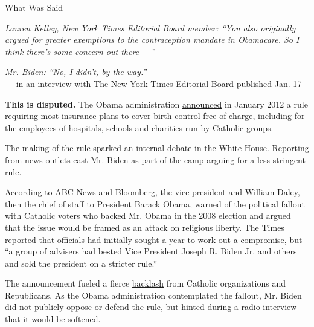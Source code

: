 What Was Said

\emph{Lauren Kelley, New York Times Editorial Board member: ``You also
originally argued for greater exemptions to the contraception mandate in
Obamacare. So I think there's some concern out there ---''}

\emph{Mr. Biden: ``No, I didn't, by the way.''}\\
--- in an
\href{https://www.nytimes3xbfgragh.onion/interactive/2020/01/17/opinion/joe-biden-nytimes-interview.html?action=click\&module=Opinion\&pgtype=Homepage}{interview}
with The New York Times Editorial Board published Jan. 17

\textbf{This is disputed.} The Obama administration
\href{https://www.nytimes3xbfgragh.onion/2012/01/21/health/policy/administration-rules-insurers-must-cover-contraceptives.html?action=click\&module=RelatedCoverage\&pgtype=Article\&region=Footer}{announced}
in January 2012 a rule requiring most insurance plans to cover birth
control free of charge, including for the employees of hospitals,
schools and charities run by Catholic groups.

The making of the rule sparked an internal debate in the White House.
Reporting from news outlets cast Mr. Biden as part of the camp arguing
for a less stringent rule.

\href{https://abcnews.go.com/blogs/politics/2012/02/policy-and-politics-of-contraception-rule-fiercely-debated-within-white-house/\#.TzR5kgDpy50.twitter}{According
to ABC News} and
\href{http://www.bloomberg.com/news/2012-02-08/obama-weighed-religious-politics-before-taking-decision-on-contraceptives.html}{Bloomberg},
the vice president and William Daley, then the chief of staff to
President Barack Obama, warned of the political fallout with Catholic
voters who backed Mr. Obama in the 2008 election and argued that the
issue would be framed as an attack on religious liberty. The Times
\href{https://www.nytimes3xbfgragh.onion/2012/02/11/health/policy/obama-to-offer-accommodation-on-birth-control-rule-officials-say.html}{reported}
that officials had initially sought a year to work out a compromise, but
``a group of advisers had bested Vice President Joseph R. Biden Jr. and
others and sold the president on a stricter rule.''

The announcement fueled a fierce
\href{https://www.nytimes3xbfgragh.onion/2012/01/30/health/policy/law-fuels-contraception-controversy-on-catholic-campuses.html}{backlash}
from Catholic organizations and Republicans. As the Obama administration
contemplated the fallout, Mr. Biden did not publicly oppose or defend
the rule, but hinted during
\href{https://abcnews.go.com/blogs/politics/2012/02/biden-on-contraception-controversy-we-can-work-it-out}{a
radio interview} that it would be softened.

